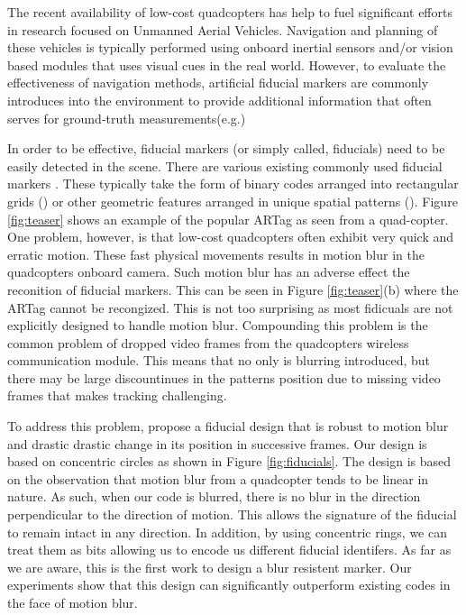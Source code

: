 \documentclass[runningheads]{llncs}
\begin{document}
The recent availability of low-cost quadcopters has help to fuel significant efforts in
research focused on Unmanned Aerial Vehicles.  Navigation and planning of
these vehicles is typically performed using onboard inertial sensors and/or
vision based modules that uses visual cues in the real world\cite{Davison:2007}. 
However, to evaluate the effectiveness of navigation methods, artificial
fiducial markers are commonly introduces into the environment to provide
additional information that often serves for ground-truth
measurements(e.g.\cite{Bosnak:2012}\cite{Lim09})

In order to be effective, fiducial markers (or simply called, fiducials) need
to be easily detected in the scene.  There are various existing commonly
used fiducial markers 
\cite{NaimarkF02}\cite{ARToolkit02}\cite{Fiala05}\cite{Pitag13}\cite{runetag11}.
These typically take the form of binary codes arranged into rectangular grids (\cite{ARToolkit02}\cite{Fiala05})
or other geometric features arranged in unique spatial patterns
(\cite{NaimarkF02}\cite{Pitag13}\cite{runetag11}).
Figure \ref{fig:teaser} shows an example of the popular ARTag\cite{Fiala05} as
seen from a quad-copter.  One problem, however, is that low-cost quadcopters
often exhibit very quick and erratic motion.  These fast physical movements
results in motion blur in the quadcopters onboard camera.  Such motion blur has an adverse effect the
reconition of fiducial  markers.  This can be seen in Figure \ref{fig:teaser}(b)
where the ARTag cannot be recongized. This is not too surprising as most
fidicuals are not explicitly designed to handle motion blur.  Compounding this
problem is the common problem of dropped video frames from the quadcopters
wireless communication module.   This means that no only is blurring
introduced, but there may be large discountinues in the patterns position due
to missing video frames that makes tracking challenging.

To address this problem, propose a fiducial design that is robust to motion
blur and drastic drastic change in its position in successive frames.  Our
design is based on concentric circles as shown in Figure \ref{fig:fiducials}. 
The design is based on the observation that motion blur from a quadcopter tends
to be linear in nature.  As such, when our code is blurred, there is no blur in
the direction perpendicular to the direction of motion.   This allows the
signature of the fiducial to remain intact in any direction.  In addition, by
using concentric rings, we can treat them as bits allowing us to encode us
different fiducial identifers.  As far as we are aware, this is the first work
to design a blur resistent marker.   Our experiments show that this design can
significantly outperform existing codes in the face of motion blur.
\end{document}
